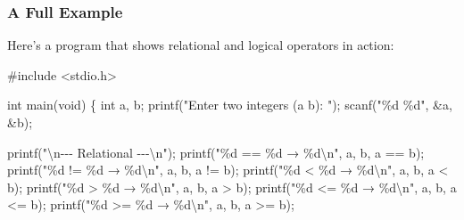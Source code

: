 \documentclass[
  letterpaper,
  DIV=11,
  numbers=noendperiod]{scrreprt}
\newenvironment{Shaded}{\begin{snugshade}}{\end{snugshade}}
\newcommand{\DataTypeTok}[1]{\textcolor[rgb]{0.68,0.00,0.00}{#1}}
\newcommand{\ImportTok}[1]{\textcolor[rgb]{0.00,0.46,0.62}{#1}}
\newcommand{\NormalTok}[1]{\textcolor[rgb]{0.00,0.23,0.31}{#1}}
\newcommand{\OperatorTok}[1]{\textcolor[rgb]{0.37,0.37,0.37}{#1}}
\newcommand{\PreprocessorTok}[1]{\textcolor[rgb]{0.68,0.00,0.00}{#1}}
\newcommand{\SpecialCharTok}[1]{\textcolor[rgb]{0.37,0.37,0.37}{#1}}
\newcommand{\StringTok}[1]{\textcolor[rgb]{0.13,0.47,0.30}{#1}}
\begin{document}
\subsubsection{A Full Example}\label{a-full-example-6}

Here's a program that shows relational and logical operators in action:

\begin{Shaded}
\begin{Highlighting}[]
\PreprocessorTok{\#include }\ImportTok{\textless{}stdio.h\textgreater{}}

\DataTypeTok{int}\NormalTok{ main}\OperatorTok{(}\DataTypeTok{void}\OperatorTok{)} \OperatorTok{\{}
    \DataTypeTok{int}\NormalTok{ a}\OperatorTok{,}\NormalTok{ b}\OperatorTok{;}
\NormalTok{    printf}\OperatorTok{(}\StringTok{"Enter two integers (a b): "}\OperatorTok{);}
\NormalTok{    scanf}\OperatorTok{(}\StringTok{"}\SpecialCharTok{\%d}\StringTok{ }\SpecialCharTok{\%d}\StringTok{"}\OperatorTok{,} \OperatorTok{\&}\NormalTok{a}\OperatorTok{,} \OperatorTok{\&}\NormalTok{b}\OperatorTok{);}

\NormalTok{    printf}\OperatorTok{(}\StringTok{"}\SpecialCharTok{\textbackslash{}n}\StringTok{{-}{-}{-} Relational {-}{-}{-}}\SpecialCharTok{\textbackslash{}n}\StringTok{"}\OperatorTok{);}
\NormalTok{    printf}\OperatorTok{(}\StringTok{"}\SpecialCharTok{\%d}\StringTok{ == }\SpecialCharTok{\%d}\StringTok{ → }\SpecialCharTok{\%d\textbackslash{}n}\StringTok{"}\OperatorTok{,}\NormalTok{ a}\OperatorTok{,}\NormalTok{ b}\OperatorTok{,}\NormalTok{ a }\OperatorTok{==}\NormalTok{ b}\OperatorTok{);}
\NormalTok{    printf}\OperatorTok{(}\StringTok{"}\SpecialCharTok{\%d}\StringTok{ != }\SpecialCharTok{\%d}\StringTok{ → }\SpecialCharTok{\%d\textbackslash{}n}\StringTok{"}\OperatorTok{,}\NormalTok{ a}\OperatorTok{,}\NormalTok{ b}\OperatorTok{,}\NormalTok{ a }\OperatorTok{!=}\NormalTok{ b}\OperatorTok{);}
\NormalTok{    printf}\OperatorTok{(}\StringTok{"}\SpecialCharTok{\%d}\StringTok{ \textless{}  }\SpecialCharTok{\%d}\StringTok{ → }\SpecialCharTok{\%d\textbackslash{}n}\StringTok{"}\OperatorTok{,}\NormalTok{ a}\OperatorTok{,}\NormalTok{ b}\OperatorTok{,}\NormalTok{ a }\OperatorTok{\textless{}}\NormalTok{ b}\OperatorTok{);}
\NormalTok{    printf}\OperatorTok{(}\StringTok{"}\SpecialCharTok{\%d}\StringTok{ \textgreater{}  }\SpecialCharTok{\%d}\StringTok{ → }\SpecialCharTok{\%d\textbackslash{}n}\StringTok{"}\OperatorTok{,}\NormalTok{ a}\OperatorTok{,}\NormalTok{ b}\OperatorTok{,}\NormalTok{ a }\OperatorTok{\textgreater{}}\NormalTok{ b}\OperatorTok{);}
\NormalTok{    printf}\OperatorTok{(}\StringTok{"}\SpecialCharTok{\%d}\StringTok{ \textless{}= }\SpecialCharTok{\%d}\StringTok{ → }\SpecialCharTok{\%d\textbackslash{}n}\StringTok{"}\OperatorTok{,}\NormalTok{ a}\OperatorTok{,}\NormalTok{ b}\OperatorTok{,}\NormalTok{ a }\OperatorTok{\textless{}=}\NormalTok{ b}\OperatorTok{);}
\NormalTok{    printf}\OperatorTok{(}\StringTok{"}\SpecialCharTok{\%d}\StringTok{ \textgreater{}= }\SpecialCharTok{\%d}\StringTok{ → }\SpecialCharTok{\%d\textbackslash{}n}\StringTok{"}\OperatorTok{,}\NormalTok{ a}\OperatorTok{,}\NormalTok{ b}\OperatorTok{,}\NormalTok{ a }\OperatorTok{\textgreater{}=}\NormalTok{ b}\OperatorTok{);}


\end{Highlighting}
\end{Shaded}
\end{document}
